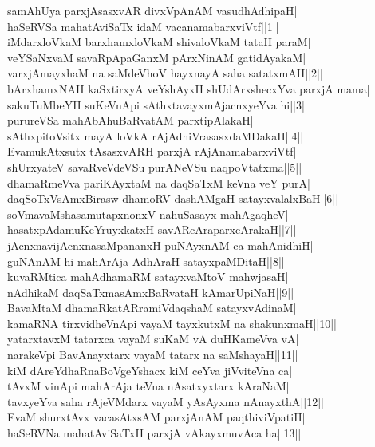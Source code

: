 \documentclass{article}
\begin{document}
samAhUya parxjAsasxvAR divxVpAnAM vasudhAdhipaH|\\
haSeRVSa mahatAviSaTx idaM vacanamabarxviVtf||1||\\
iMdarxloVkaM barxhamxloVkaM shivaloVkaM tataH paraM|\\
veYSaNxvaM savaRpApaGanxM pArxNinAM gatidAyakaM|\\
varxjAmayxhaM na saMdeVhoV hayxnayA saha satatxmAH||2||\\
bArxhamxNAH kaSxtirxyA veYshAyxH shUdArxshecxYva parxjA mama|\\
sakuTuMbeYH suKeVnApi sAthxtavayxmAjacnxyeYva hi||3||\\
purureVSa mahAbAhuBaRvatAM parxtipAlakaH|\\
sAthxpitoVsitx mayA loVkA rAjAdhiVrasasxdaMDakaH||4||\\
EvamukAtxsutx tAsasxvARH parxjA rAjAnamabarxviVtf|\\
shUrxyateV savaRveVdeVSu purANeVSu naqpoVtatxma||5||\\
dhamaRmeVva pariKAyxtaM na daqSaTxM keVna veY purA|\\
daqSoTxVsAmxBirasw dhamoRV dashAMgaH satayxvalalxBaH||6||\\
soVmavaMshasamutapxnonxV nahuSasayx mahAgaqheV|\\
hasatxpAdamuKeYruyxkatxH savARcAraparxcArakaH||7||\\
jAcnxnavijAcnxnasaMpananxH puNAyxnAM ca mahAnidhiH|\\
guNAnAM hi mahArAja AdhAraH satayxpaMDitaH||8||\\
kuvaRMtica mahAdhamaRM satayxvaMtoV mahwjasaH|\\
nAdhikaM daqSaTxmasAmxBaRvataH kAmarUpiNaH||9||\\
BavaMtaM dhamaRkatARramiVdaqshaM satayxvAdinaM|\\
kamaRNA tirxvidheVnApi vayaM tayxkutxM na shakunxmaH||10||\\
yatarxtavxM tatarxca vayaM suKaM vA duHKameVva vA|\\
narakeVpi BavAnayxtarx vayaM tatarx na saMshayaH||11||\\
kiM dAreYdhaRnaBoVgeYshacx kiM ceYva jiVviteVna ca|\\
tAvxM vinApi mahArAja teVna nAsatxyxtarx kAraNaM|\\
tavxyeYva saha rAjeVMdarx vayaM yAsAyxma nAnayxthA||12||\\
EvaM shurxtAvx vacasAtxsAM parxjAnAM paqthiviVpatiH|\\
haSeRVNa mahatAviSaTxH parxjA vAkayxmuvAca ha||13||\\
\end{document}
